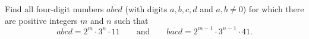 Find all four-digit numbers $\overline{abcd}$ (with digits $a,b,c,d$ and $a,b\ne0$) for which there are positive integers $m$ and $n$ such that
\[\overline{abcd}=2^m\cdot3^n\cdot11\qquad\text{and}\qquad\overline{bacd}=2^{m-1}\cdot3^{n-1}\cdot41.\]
